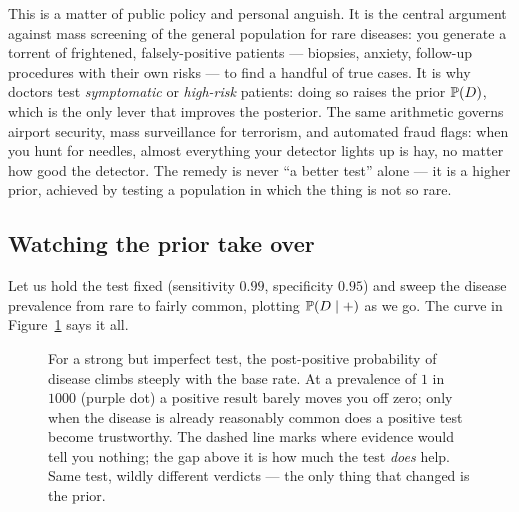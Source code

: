 \begin{aestheticbox}
This is a matter of public policy and personal anguish.
It is the central argument against mass screening of the general population for rare
diseases: you generate a torrent of frightened, falsely-positive patients --- biopsies,
anxiety, follow-up procedures with their own risks --- to find a handful of true cases.
It is why doctors test \emph{symptomatic} or \emph{high-risk} patients: doing so raises
the prior $\P(D)$, which is the only lever that improves the posterior. The same
arithmetic governs airport security, mass surveillance for terrorism, and automated fraud
flags: when you hunt for needles, almost everything your detector lights up is hay, no
matter how good the detector. The remedy is never ``a better test'' alone --- it is a
higher prior, achieved by testing a population in which the thing is not so rare.
\end{aestheticbox}

\subsection{Watching the prior take over}

Let us
hold the test fixed (sensitivity $0.99$, specificity $0.95$) and sweep the disease
prevalence from rare to fairly common, plotting $\P(D \given +)$ as we go. The
curve in Figure~\ref{ch05:fig-baserate} says it all.

\begin{figure}[H]
\centering
{}
\caption{For a strong but imperfect test, the post-positive probability of disease climbs
steeply with the base rate. At a prevalence of $1$ in $1000$ (purple dot) a positive
result barely moves you off zero; only when the disease is already reasonably common does
a positive test become trustworthy. The dashed line marks where evidence would tell you
nothing; the gap above it is how much the test \emph{does} help. Same test, wildly
different verdicts --- the only thing that changed is the prior.}
\label{ch05:fig-baserate}
\end{figure}

